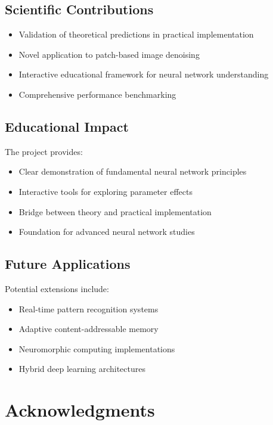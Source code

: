 \documentclass[11pt,a4paper]{article}
\begin{document}
\subsection{Scientific Contributions}

\begin{itemize}
    \item Validation of theoretical predictions in practical implementation
    \item Novel application to patch-based image denoising
    \item Interactive educational framework for neural network understanding
    \item Comprehensive performance benchmarking
\end{itemize}

\subsection{Educational Impact}

The project provides:
\begin{itemize}
    \item Clear demonstration of fundamental neural network principles
    \item Interactive tools for exploring parameter effects
    \item Bridge between theory and practical implementation
    \item Foundation for advanced neural network studies
\end{itemize}

\subsection{Future Applications}

Potential extensions include:
\begin{itemize}
    \item Real-time pattern recognition systems
    \item Adaptive content-addressable memory
    \item Neuromorphic computing implementations
    \item Hybrid deep learning architectures
\end{itemize}

\section{Acknowledgments}
\end{document}
